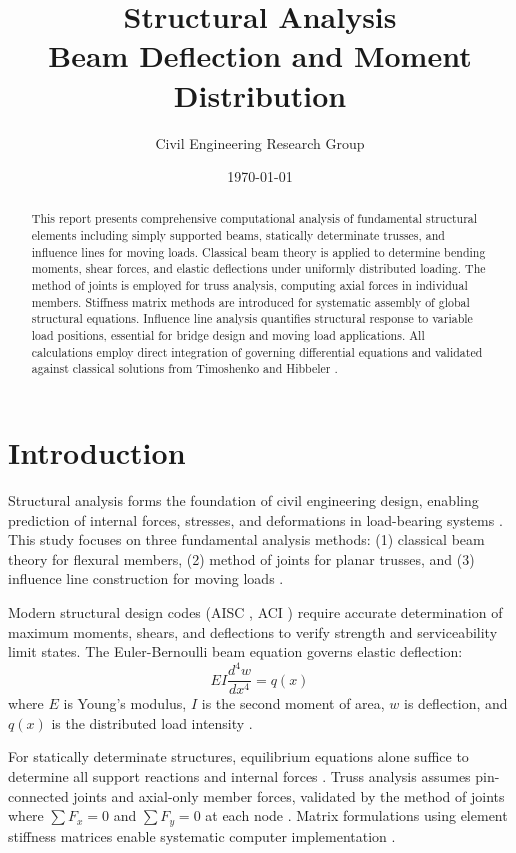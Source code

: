 \documentclass[11pt,a4paper]{article}
\title{Structural Analysis\\Beam Deflection and Moment Distribution}
\author{Civil Engineering Research Group}
\date{\today}
\begin{document}
\maketitle

\begin{abstract}
This report presents comprehensive computational analysis of fundamental structural elements including simply supported beams, statically determinate trusses, and influence lines for moving loads. Classical beam theory is applied to determine bending moments, shear forces, and elastic deflections under uniformly distributed loading. The method of joints is employed for truss analysis, computing axial forces in individual members. Stiffness matrix methods are introduced for systematic assembly of global structural equations. Influence line analysis quantifies structural response to variable load positions, essential for bridge design and moving load applications. All calculations employ direct integration of governing differential equations and validated against classical solutions from Timoshenko \cite{timoshenko1970theory} and Hibbeler \cite{hibbeler2017structural}.
\end{abstract}

\section{Introduction}

Structural analysis forms the foundation of civil engineering design, enabling prediction of internal forces, stresses, and deformations in load-bearing systems \cite{kassimali2011structural}. This study focuses on three fundamental analysis methods: (1) classical beam theory for flexural members, (2) method of joints for planar trusses, and (3) influence line construction for moving loads \cite{hibbeler2017structural}.

Modern structural design codes (AISC \cite{aisc2016specification}, ACI \cite{aci2014building}) require accurate determination of maximum moments, shears, and deflections to verify strength and serviceability limit states. The Euler-Bernoulli beam equation governs elastic deflection:
\begin{equation}
EI \frac{d^4 w}{dx^4} = q(x)
\end{equation}
where $E$ is Young's modulus, $I$ is the second moment of area, $w$ is deflection, and $q(x)$ is the distributed load intensity \cite{gere2009mechanics}.

For statically determinate structures, equilibrium equations alone suffice to determine all support reactions and internal forces \cite{kassimali2011structural}. Truss analysis assumes pin-connected joints and axial-only member forces, validated by the method of joints where $\sum F_x = 0$ and $\sum F_y = 0$ at each node \cite{hibbeler2017structural}. Matrix formulations using element stiffness matrices enable systematic computer implementation \cite{mcguire2000matrix}.
\end{document}
